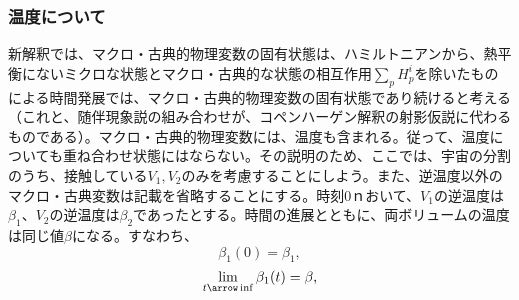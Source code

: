 \subsubsection{温度について}
新解釈では、マクロ・古典的物理変数の固有状態は、ハミルトニアンから、熱平衡にないミクロな状態とマクロ・古典的な状態の相互作用$\sum_pH_p^i$を除いたものによる時間発展では、マクロ・古典的物理変数の固有状態であり続けると考える（これと、随伴現象説の組み合わせが、コペンハーゲン解釈の射影仮説に代わるものである）。マクロ・古典的物理変数には、温度も含まれる。従って、温度についても重ね合わせ状態にはならない。その説明のため、ここでは、宇宙の分割のうち、接触している${V_1,V_2}$のみを考慮することにしよう。また、逆温度以外のマクロ・古典変数は記載を省略することにする。時刻$0$ｎおいて、$V_1$の逆温度は$\beta_1$、$V_2$の逆温度は$\beta_2$であったとする。時間の進展とともに、両ボリュームの温度は同じ値$\beta$になる。すなわち、
\begin{equation}
    \beta_1(0) = \beta_1,
\end{equation}
\begin{equation}
    \lim_{t \arrow \inf} \beta_1(t) = \beta,
\end{equation}


